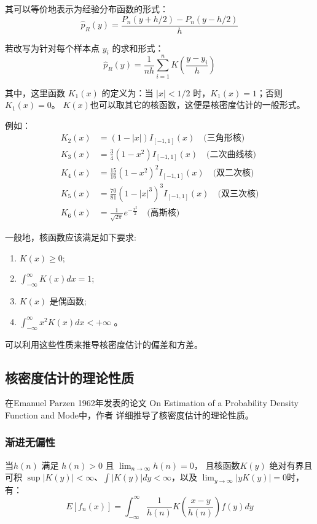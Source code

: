 \documentclass[UTF8]{ctexart}
\begin{document}
其可以等价地表示为经验分布函数的形式：
\begin{equation}
\hat{p}_R(y) = \frac{P_n(y + h/2) - P_n(y - h/2)}{h}
\end{equation}

若改写为针对每个样本点 $y_i$ 的求和形式：
\begin{equation}
\hat{p}_R(y) = \frac{1}{nh} \sum_{i=1}^n K\left(\frac{y - y_i}{h}\right)
\end{equation}

其中，这里函数 $K_1(x)$ 的定义为：当 $|x| < 1/2$ 时，$K_1(x) = 1$；否则 $K_1(x) = 0$。
$K(x)$也可以取其它的核函数，这便是核密度估计的一般形式。

例如：
\begin{align*}
K_2(x) &= (1-|x|)I_{[-1,1]}(x) \quad \text{(三角形核)} \\
K_3(x) &= \frac{3}{4}(1-x^2)I_{[-1,1]}(x) \quad \text{(二次曲线核)} \\
K_4(x) &= \frac{15}{16}(1-x^2)^2I_{[-1,1]}(x) \quad \text{(双二次核)} \\
K_5(x) &= \frac{70}{81}(1-|x|^3)^3I_{[-1,1]}(x) \quad \text{(双三次核)} \\
K_6(x) &= \frac{1}{\sqrt{2\pi}}e^{-\frac{x^2}{2}} \quad \text{(高斯核)}
\end{align*}

一般地，核函数应该满足如下要求:
\begin{enumerate}
    \item $K(x) \ge 0$;
    \item $\int_{-\infty}^{\infty} K(x)dx = 1$;
    \item $K(x)$ 是偶函数;
    \item $\int_{-\infty}^{\infty} x^2 K(x)dx < +\infty$ 。
\end{enumerate}

可以利用这些性质来推导核密度估计的偏差和方差。

\subsection{核密度估计的理论性质}

在Emanuel Parzen 1962年发表的论文
On Estimation of a Probability Density Function and Mode中，作者
详细推导了核密度估计的理论性质。

\subsubsection{渐进无偏性}

当$h(n)$ 满足 $h(n) > 0$ 且 $\lim_{n \rightarrow \infty} h(n) = 0$，
且核函数$K(y)$
绝对有界且可积 $\sup |K(y)| < \infty$、$\int |K(y)|dy < \infty$，以及
$\lim_{y \rightarrow \infty} |yK(y)| = 0$时，
有：
\begin{equation}
E[f_n(x)] = \int_{-\infty}^{\infty} \frac{1}{h(n)} K\left(\frac{x-y}{h(n)}\right) f(y) dy
\end{equation}
\end{document}
